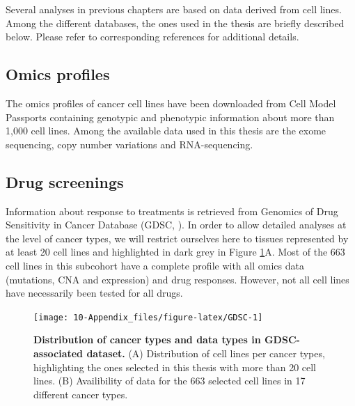 \documentclass[a4paper,12pt,twoside,onecolumn,openright,final,oldfontcommands]{memoir}
\begin{document}
Several analyses in previous chapters are based on data derived from
cell lines. Among the different databases, the ones used in the thesis
are briefly described below. Please refer to corresponding references
for additional details.

\subsection{Omics profiles}\label{omics-profiles}

The omics profiles of cancer cell lines have been downloaded from Cell
Model Passports \citep{van2019cell} containing genotypic and phenotypic
information about more than 1,000 cell lines. Among the available data
used in this thesis are the exome sequencing, copy number variations and
RNA-sequencing.

\subsection{Drug screenings}\label{appendix-GDSC}

Information about response to treatments is retrieved from Genomics of
Drug Sensitivity in Cancer Database (GDSC, \citet{yang2012genomics}). In
order to allow detailed analyses at the level of cancer types, we will
restrict ourselves here to tissues represented by at least 20 cell lines
and highlighted in dark grey in Figure \ref{fig:GDSC}A. Most of the 663
cell lines in this subcohort have a complete profile with all omics data
(mutations, CNA and expression) and drug responses. However, not all
cell lines have necessarily been tested for all drugs.

\begin{figure}

{\centering \texttt{[image: 10-Appendix\_files/figure-latex/GDSC-1]} 

}

\caption[Distribution of cancer types and data types in GDSC-associated dataset]{\textbf{Distribution of cancer types and data types
in GDSC-associated dataset.} (A) Distribution of cell lines per cancer
types, highlighting the ones selected in this thesis with more than 20
cell lines. (B) Availibility of data for the 663 selected cell lines in
17 different cancer types.}\label{fig:GDSC}
\end{figure}
\end{document}

